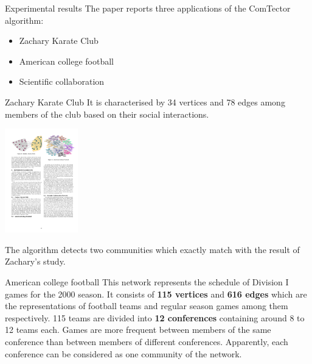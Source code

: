 \begin{frame}{Experimental results}
\vskip 0.7cm
The paper reports three applications of the ComTector algorithm:
\vskip 0.3cm
\begin{itemize}
	\item Zachary Karate Club
	\item American college football
	\item Scientific collaboration
\end{itemize}
\end{frame}

\begin{frame}{Zachary Karate Club}
\vskip 0.7cm
It is characterised by 34 vertices and 78 edges among members of the club based on their social interactions.
\vskip 0.3cm
\begin{center}
	\includegraphics[height=4.5cm]{images/zacharyClub.pdf}
\end{center}
The algorithm detects two communities which exactly match with the result of Zachary’s study.
\end{frame}

\begin{frame}{American college football}
\vskip 0.7cm
This network represents the schedule of Division I games for the 2000 season. 
\vskip 0.2cm
It consists of \textbf{115 vertices} and \textbf{616 edges} which are the representations of football teams and regular season games among them respectively. 
\vskip 0.2cm
115 teams are divided into \textbf{12 conferences} containing around 8 to 12 teams each. 
\vskip 0.2cm
Games are more frequent between members of the same conference than between members of different conferences. 
\vskip 0.2cm
Apparently, each conference can be considered as one community of the network.

\end{frame}

